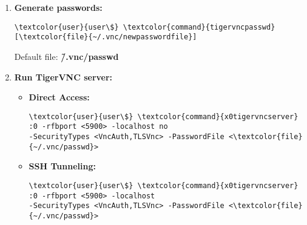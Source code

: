 \documentclass[10pt, a4paper, onecolumn, openany]{book} %
\begin{document}
\begin{itemize}
\begin{enumerate}
\begin{Verbatim}[commandchars=\\\{\}]
\textcolor{root}{root#} \textcolor{command}{apt} install tigervnc-scraping-server
\end{Verbatim}
       \item \textbf{Generate passwords:}
\begin{Verbatim}[commandchars=\\\{\}]
\textcolor{user}{user\$} \textcolor{command}{tigervncpasswd} [\textcolor{file}{~/.vnc/newpasswordfile}]
\end{Verbatim}
Default file: \textbf{\textcolor{file}{\~/.vnc/passwd}}
        \item \textbf{Run TigerVNC server:}
        \begin{itemize}
            \item \textbf{Direct Access:}
\begin{Verbatim}[commandchars=\\\{\}]
\textcolor{user}{user\$} \textcolor{command}{x0tigervncserver} :0 -rfbport <5900> -localhost no
-SecurityTypes <VncAuth,TLSVnc> -PasswordFile <\textcolor{file}{~/.vnc/passwd}>
\end{Verbatim}    
            \item \textbf{SSH Tunneling:}
\begin{Verbatim}[commandchars=\\\{\}]
\textcolor{user}{user\$} \textcolor{command}{x0tigervncserver} :0 -rfbport <5900> -localhost
-SecurityTypes <VncAuth,TLSVnc> -PasswordFile <\textcolor{file}{~/.vnc/passwd}>
\end{Verbatim}
        \end{itemize}
    \end{enumerate}
\end{itemize}
\end{document}
